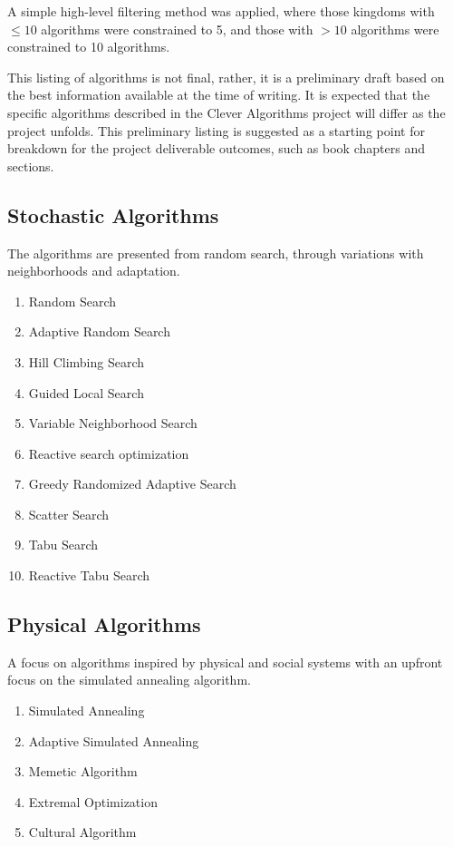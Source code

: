 \documentclass[a4paper, 11pt]{article}
\begin{document}
A simple high-level filtering method was applied, where those kingdoms with $\leq 10$ algorithms were constrained to 5, and those with $>10$ algorithms were constrained to 10 algorithms.

This listing of algorithms is not final, rather, it is a preliminary draft based on the best information available at the time of writing. It is expected that the specific algorithms described in the Clever Algorithms project will differ as the project unfolds. This preliminary listing is suggested as a starting point for breakdown for the project deliverable outcomes, such as book chapters and sections.


\subsection{Stochastic Algorithms}
The algorithms are presented from random search, through variations with neighborhoods and adaptation. 

\begin{enumerate}
	\item Random Search
	\item Adaptive Random Search
	\item Hill Climbing Search
	\item Guided Local Search
	\item Variable Neighborhood Search
	\item Reactive search optimization
	\item Greedy Randomized Adaptive Search
	\item Scatter Search
	\item Tabu Search
	\item Reactive Tabu Search
\end{enumerate}

\subsection{Physical Algorithms}
A focus on algorithms inspired by physical and social systems with an upfront focus on the simulated annealing algorithm.

\begin{enumerate}
	\item Simulated Annealing
	\item Adaptive Simulated Annealing
	\item Memetic Algorithm	
	\item Extremal Optimization
	\item Cultural Algorithm
\end{enumerate}
\end{document}
